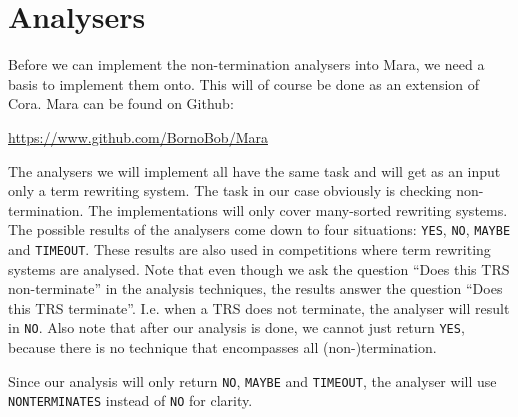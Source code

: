 \chapter{Analysers}\label{analysers}
Before we can implement the non-termination analysers into Mara, we need a basis to implement them onto. This will of course be done as an extension of Cora. Mara can be found on Github:

\begin{center}
\url{https://www.github.com/BornoBob/Mara}
\end{center}

The analysers we will implement all have the same task and will get as an input only a term rewriting system. The task in our case obviously is checking non-termination. The implementations will only cover many-sorted rewriting systems. The possible results of the analysers come down to four situations: \texttt{YES}, \texttt{NO}, \texttt{MAYBE} and \texttt{TIMEOUT}. These results are also used in competitions where term rewriting systems are analysed\cite{TermPortal}. Note that even though we ask the question ``Does this TRS non-terminate'' in the analysis techniques, the results answer the question ``Does this TRS terminate''. I.e. when a TRS does not terminate, the analyser will result in \texttt{NO}. Also note that after our analysis is done, we cannot just return \texttt{YES}, because there is no technique that encompasses all (non-)termination. 

Since our analysis will only return \texttt{NO}, \texttt{MAYBE} and \texttt{TIMEOUT}, the analyser will use \texttt{NONTERMINATES} instead of \texttt{NO} for clarity. 
